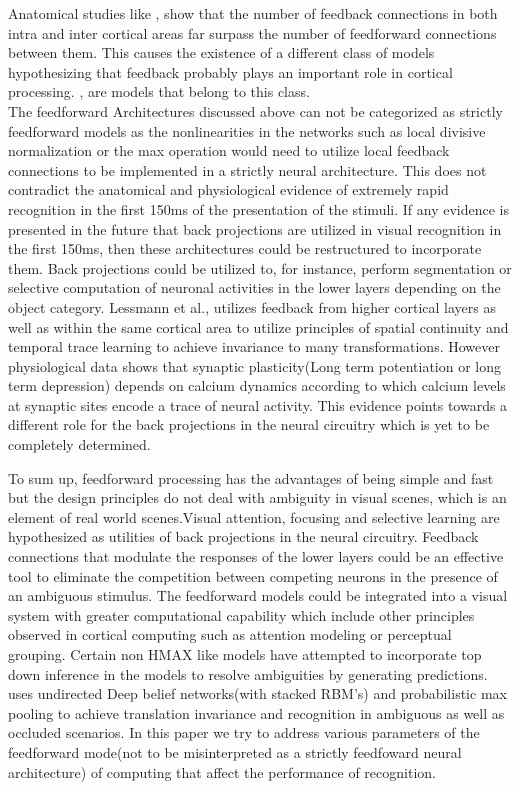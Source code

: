 \documentclass[12pt,twoside]{article}
\theoremstyle{plain}
\theoremstyle{definition}
\theoremstyle{remark}
\begin{document}
Anatomical studies like \cite{BoyapatiJ1984},\cite{Montero1991} show that the number of feedback connections in both intra and inter cortical areas far surpass the number of feedforward connections between them. This causes the existence of a different class of models hypothesizing that feedback probably plays an important role in cortical processing\cite{Macknik2007}. \cite{MarkusLessmann2014},\cite{DileepGeorge2009} are models that belong to this class.\\
The feedforward Architectures discussed above can not be categorized as strictly feedforward models as the nonlinearities in the networks such as local divisive normalization or the max operation would need to utilize local feedback connections to be implemented in a strictly neural architecture. This does not contradict the anatomical and physiological evidence of extremely rapid recognition in the first 150ms of the presentation of the stimuli. If any evidence is presented in the future that back projections are utilized in visual recognition in the first 150ms, then these architectures could be restructured to incorporate them. Back projections could be utilized to, for instance, perform segmentation or selective computation of neuronal activities in the lower layers depending on the object category. Lessmann et al.,\cite{MarkusLessmann2014} utilizes feedback from higher cortical layers as well as within the same cortical area to utilize principles of  spatial continuity and temporal trace learning to achieve invariance to many transformations. However physiological data shows that synaptic plasticity(Long term potentiation or long term depression) depends on calcium dynamics according to which calcium levels at synaptic sites encode a trace of neural activity. This evidence points towards a different role for the back projections in the neural circuitry which is yet to be completely determined. 

 To sum up, feedforward processing has the advantages of being simple and fast but the design principles do not deal with ambiguity in visual scenes, which is an element of real world scenes.Visual attention, focusing and selective learning are hypothesized as utilities of back projections in the neural circuitry. Feedback connections that modulate the responses of the lower layers could be an effective tool to eliminate the competition between competing neurons in the presence of an ambiguous stimulus. The feedforward models could be integrated into a visual system with greater computational capability which include other principles observed in cortical computing such as attention modeling or perceptual grouping\cite{Grossberg2007}. Certain non HMAX like models have attempted to incorporate top down inference in the models to resolve ambiguities by generating predictions.\cite{HonglakLee2009} uses undirected Deep belief networks(with stacked RBM's) and probabilistic max pooling\cite{HonglakLee2009} to achieve translation invariance and recognition in ambiguous as well as occluded scenarios. In this paper we try to address various parameters of the feedforward mode(not to be misinterpreted as a strictly feedfoward neural architecture) of computing that affect the performance of recognition.
\end{document}
